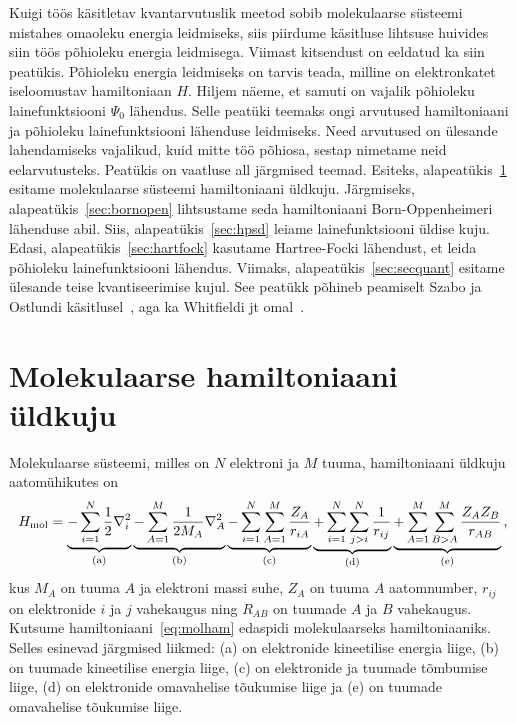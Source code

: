 \documentclass[12pt]{report}
\begin{document}
Kuigi töös käsitletav kvantarvutuslik meetod sobib molekulaarse süsteemi mistahes omaoleku energia leidmiseks, siis piirdume käsitluse lihtsuse huivides siin töös põhioleku energia leidmisega.
Viimast kitsendust on eeldatud ka siin peatükis.
Põhioleku energia leidmiseks on tarvis teada, milline on elektronkatet iseloomustav hamiltoniaan \(H\).
Hiljem näeme, et samuti on vajalik põhioleku lainefunktsiooni $\Psi_0$ lähendus.
Selle peatüki teemaks ongi arvutused hamiltoniaani ja põhioleku lainefunktsiooni lähenduse leidmiseks.
Need arvutused on ülesande lahendamiseks vajalikud, kuid mitte töö põhiosa, sestap nimetame neid eelarvutusteks.
Peatükis on vaatluse all järgmised teemad.
Esiteks, alapeatükis~\ref{sec:molhamgen} esitame molekulaarse süsteemi hamiltoniaani üld\-kuju.
Järgmiseks, alapeatükis~\ref{sec:bornopen} lihtsustame seda hamiltoniaani Born-Oppenheimeri lähenduse abil.
Siis, alapeatükis~\ref{sec:hpsd} leiame lainefunktsiooni üldise kuju.
Edasi, alapeatükis~\ref{sec:hartfock} kasutame Hartree-Focki lähendust, et leida põhioleku lainefunktsiooni lähendus.
Viimaks, alapeatükis~\ref{sec:secquant} esitame ülesande teise kvantiseerimise kujul.
See peatükk põhineb peamiselt Szabo ja Ostlundi käsitlusel~\cite{szabo+ostlund}, aga ka Whitfieldi jt omal~\cite{whitfield+etal2011}.

\section{Molekulaarse hamiltoniaani üldkuju}\label{sec:molhamgen}

Molekulaarse süsteemi, milles on \(N\) elektroni ja \(M\) tuuma, hamiltoniaani üldkuju aatom\-ühikutes on
\begin{align}\label{eq:molham}
    H_\text{mol} =
    \underbrace{- \sum_{i = 1}^N \frac{1}{2} \nabla_i^2}_\text{(a)}
    \underbrace{- \sum_{A = 1}^M \frac{1}{2 M_A} \nabla_A^2}_\text{(b)}
    \underbrace{- \sum_{i = 1}^N \sum_{A = 1}^M \frac{Z_A}{r_{iA}}}_\text{(c)}
    \underbrace{+ \sum_{i = 1}^N \sum_{j > i}^N \frac{1}{r_{ij}}}_\text{(d)}
    \underbrace{+ \sum_{A = 1}^M \sum_{B > A}^M \frac{Z_A Z_B}{r_{AB}}}_\text{(e)} \rlap{,}
\end{align}
kus \(M_A\) on tuuma \(A\) ja elektroni massi suhe, \(Z_A\) on tuuma \(A\) aatomnumber, \(r_{ij}\) on elektronide \(i\) ja \(j\) vahekaugus ning \(R_{AB}\) on tuumade \(A\) ja \(B\) vahekaugus.
Kutsume hamiltoniaani~\eqref{eq:molham} edaspidi molekulaarseks hamiltoniaaniks.
Selles esinevad järgmised liikmed: (a) on elektronide kineetilise energia liige, (b) on tuumade kineetilise energia liige, (c) on elektronide ja tuumade tõmbumise liige, (d) on elektronide omavahelise tõukumise liige ja (e) on tuumade omavahelise tõukumise liige.
\end{document}
